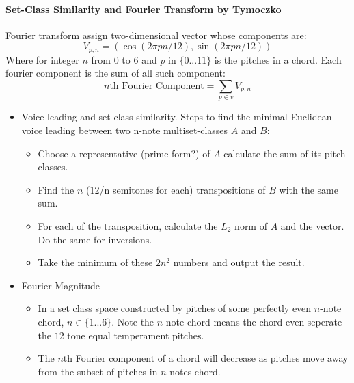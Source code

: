 \paragraph*{Set-Class Similarity and Fourier Transform by Tymoczko}
Fourier transform assign two-dimensional vector whose components are:
\[V_{p,n}=(\cos(2\pi pn/12), \sin(2\pi pn/12))\]
Where for integer $n$ from $0$ to $6$ and $p$ in $\{0...11\}$ is the pitches
in a chord. Each fourier component is the sum of all such component:
\[n\text{th Fourier Component}=\sum_{p\in v}V_{p,n}\]
\begin{itemize}
    \item Voice leading and set-class similarity. Steps
    to find the minimal Euclidean voice leading between two n-note 
    multiset-classes $A$ and $B$:
        \begin{itemize}
            \item Choose a representative (prime form?) of $A$ calculate 
            the sum of its pitch classes.
            \item Find the $n$ (12/n semitones for each) 
            transpositions of $B$ with the same sum.
            \item For each of the transposition, calculate the $L_2$
            norm of $A$ and the vector. Do the same for inversions.
            \item Take the minimum of these $2n^2$ numbers and output the 
            result.
        \end{itemize}
    \item Fourier Magnitude
        \begin{itemize}
            \item In a set class space constructed by pitches of some 
            perfectly even $n$-note chord, $n\in\{1...6\}$. Note the $n$-note
            chord means the chord even seperate the $12$ tone equal 
            temperament pitches. 
            \item The $n$th Fourier component of a chord will decrease 
            as pitches move away from the subset of pitches in $n$ notes 
            chord. 
            
        \end{itemize}
\end{itemize}


